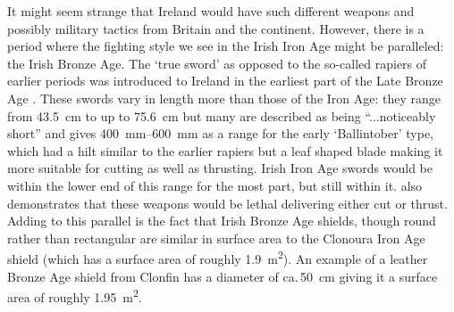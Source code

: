 It might seem strange that Ireland would have such different weapons and possibly military tactics from Britain and the continent. 
However, there is a period where the fighting style we see in the Irish Iron Age might be paralleled: 
the Irish Bronze Age. The ‘true sword’ as opposed to the so-called rapiers of earlier periods was introduced to Ireland in the earliest part of the Late Bronze Age \parencite[132\psq]{Mallory2013}. These swords vary in length more than those of the Iron Age: they range from \SI{43.5}{\cm} to up to \SI{75.6}{\cm} but many are described as being “...noticeably short” \parencite[52]{Colquhoun2011} and \textcite[105]{Molloy2007} gives \SIrange{400}{600}{\mm} as a range for the early ‘Ballintober’ type, which had a hilt similar to the earlier rapiers but a leaf shaped blade making it more suitable for cutting as well as thrusting.
Irish Iron Age swords would be within the lower end of this range for the most part, but still within it. 
\textcite[105--107]{Molloy2007}  also demonstrates that these weapons would be lethal delivering either cut or thrust. 
Adding to this parallel is the fact that Irish Bronze Age shields,
 though round rather than rectangular are similar in surface area to the Clonoura Iron Age shield (which has a surface area of roughly \SI{1.9}{\meter\squared}). 
An example of a leather Bronze Age shield from Clonfin has a diameter of ca.\,\SI{50}{\cm} \parencite[25]{Osgood2001} giving it a surface area of roughly \SI{1.95}{\meter\squared}.

